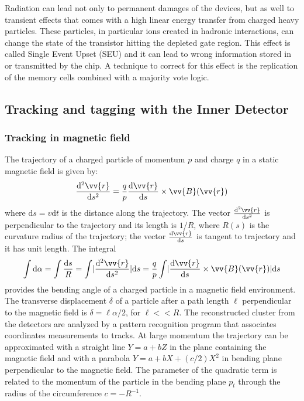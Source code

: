 Radiation can lead not only to permanent damages of the devices, but as well to transient effects that comes with a high linear energy transfer from charged heavy particles.  These particles, in particular ions created in hadronic interactions, can change the state of the transistor hitting the depleted gate region. This effect is called Single Event Upset (SEU) and it can lead to wrong information stored in or transmitted by the chip. A technique to correct for this effect is the replication of the memory cells combined with a majority vote logic.\\


\subsection{Tracking and tagging with the Inner Detector}
\subsubsection{Tracking in magnetic field}
The trajectory of a charged particle of momentum $p$ and charge $q$ in a static magnetic field is given by:
\begin{equation}
\frac{\mathrm{d^2}\vv{r}}{\mathrm{d}s^2} = \frac{q}{p} \frac{\mathrm{d}\vv{r}}{\mathrm{d}s}\times \vv{B}(\vv{r})
\end{equation}
where $\mathrm{d}s = v\mathrm{d}t$ is the distance along the trajectory. The vector $\frac{\mathrm{d^2}\vv{r}}{\mathrm{d}s^2}$ is perpendicular to the trajectory and its length is $1/R$, where $R(s)$ is the curvature radius of the trajectory; the vector $\frac{\mathrm{d}\vv{r}}{\mathrm{d}s}$ is tangent to trajectory and it has unit length. The integral
\begin{equation}
\int\mathrm{d}\alpha = \int \frac{\mathrm{d}s}{R} = \int \abs{\frac{\mathrm{d^2}\vv{r}}{\mathrm{d}s^2}} \mathrm{d}s = \frac{q}{p} \int \abs{\frac{\mathrm{d}\vv{r}}{\mathrm{d}s}\times \vv{B}(\vv{r})} \mathrm{d}s
\end{equation}
provides the bending angle of a charged particle in a magnetic field environment.
The transverse displacement $\delta$ of a particle after a path length $\ell$ perpendicular to the magnetic field is $\delta = \ell \alpha /2$, for $\ell <<R$.
The reconstructed cluster from the detectors are analyzed by a pattern recognition program that associates coordinates measurements to tracks.
At large momentum the trajectory can be approximated with a straight line $Y=a+bZ$ in the plane containing the magnetic field and with a parabola $Y=a+bX+(c/2)X^2$ in bending plane perpendicular to the magnetic field. The parameter of the quadratic term is related to the momentum of the particle in the bending plane $p_t$ through the radius of the circumference $c = -R^{-1}$.
